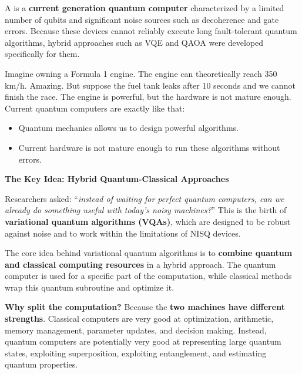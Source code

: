 \begin{definitionbox}
    A  is a \textbf{current generation quantum computer} characterized by a limited number of qubits and significant noise sources such as decoherence and gate errors. Because these devices cannot reliably execute long fault-tolerant quantum algorithms, hybrid approaches such as VQE and QAOA were developed specifically for them.
\end{definitionbox}

\highspace
\begin{examplebox}
    Imagine owning a Formula 1 engine. The engine can theoretically reach 350 km/h. Amazing. But suppose the fuel tank leaks after 10 seconds and we cannot finish the race. The engine is powerful, but the hardware is not mature enough. Current quantum computers are exactly like that:
    \begin{itemize}
        \item Quantum mechanics allows us to design powerful algorithms.
        \item Current hardware is not mature enough to run these algorithms without errors.
    \end{itemize}
\end{examplebox}

\highspace
\begin{flushleft}
    \textcolor{Green3}{ \textbf{The Key Idea: Hybrid Quantum-Classical Approaches}}
\end{flushleft}
Researchers asked: ``\emph{instead of waiting for perfect quantum computers, can we already do something useful with today's noisy machines?}'' This is the birth of \textbf{variational quantum algorithms (VQAs)}, which are designed to be robust against noise and to work within the limitations of NISQ devices.

\highspace
The core idea behind variational quantum algorithms is to \textbf{combine quantum and classical computing resources} in a hybrid approach. The quantum computer is used for a specific part of the computation, while classical methods wrap this quantum subroutine and optimize it.

\highspace
\textcolor{Green3}{ \textbf{Why split the computation?}} Because the \textbf{two machines have different strengths}. Classical computers are very good at optimization, arithmetic, memory management, parameter updates, and decision making. Instead, quantum computers are potentially very good at representing large quantum states, exploiting superposition, exploiting entanglement, and estimating quantum properties.

